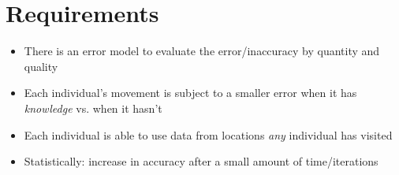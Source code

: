 \section{Requirements}
\begin{itemize}
	\item{There is an error model to evaluate the error/inaccuracy by quantity and quality}
	\item{Each individual's movement is subject to a smaller error when it has \emph{knowledge} vs. when it hasn't}
	\item{Each individual is able to use data from locations \emph{any} individual has visited}
	\item{Statistically: increase in accuracy after a small amount of time/iterations}
\end{itemize}